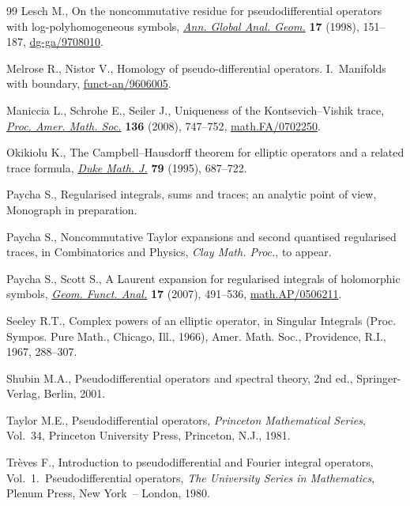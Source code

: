 \documentclass[pdftex]{sigma}
\numberwithin{equation}{section}
\begin{document}
\begin{thebibliography}{99}
Lesch M.,
On the noncommutative residue for pseudodif\/ferential operators with log-polyhomogeneous symbols,
\href{http://dx.doi.org/10.1023/A:1006504318696}{{\it Ann.  Global  Anal. Geom.}} {\bf 17} (1998),  151--187,
\href{http://arxiv.org/abs/dg-ga/9708010}{dg-ga/9708010}.

Melrose R.,  Nistor V.,
Homology of pseudo-dif\/ferential operators. I.~Manifolds with boundary,
\mbox{\href{http://arxiv.org/abs/funct-an/9606005}{funct-an/9606005}}. %

Maniccia L., Schrohe  E., Seiler J.,
 Uniqueness of the Kontsevich--Vishik trace,
\href{http://dx.doi.org/10.1090/S0002-9939-07-09168-X}{{\it Proc. Amer. Math. Soc.}} {\bf 136} (2008), 747--752,
\href{http://arxiv.org/abs/math.FA/0702250}{math.FA/0702250}.

 Okikiolu K.,
 The Campbell--Hausdorf\/f theorem for elliptic operators and a related trace formula,
\href{http://dx.doi.org/10.1215/S0012-7094-95-07918-6}{{\it Duke Math. J.}}  {\bf 79}  (1995), 687--722.

 Paycha S.,
 Regularised integrals, sums and traces; an  analytic point of view, Monograph in preparation.

Paycha S.,
Noncommutative Taylor expansions and  second quantised regularised traces,
in Combinatorics and Physics, {\it Clay Math. Proc.}, to appear.

  Paycha  S., Scott  S.,
  A  Laurent expansion for  regularised integrals of holomorphic symbols,
\href{http://dx.doi.org/10.1007/s00039-007-0597-8}{{\it Geom.  Funct. Anal.}} {\bf 17} (2007), 491--536,
\href{http://arxiv.org/abs/math.AP/0506211}{math.AP/0506211}.

Seeley R.T.,
Complex powers of an elliptic operator,
in Singular Integrals (Proc. Sympos. Pure Math., Chicago, Ill., 1966), Amer. Math. Soc., Providence, R.I., 1967, 288--307.

Shubin M.A.,
Pseudodif\/ferential operators and spectral theory, 2nd ed., Springer-Verlag, Berlin, 2001.


Taylor M.E.,  Pseudodif\/ferential operators,
{\it Princeton Mathematical Series}, Vol.~34, Princeton University Press, Princeton, N.J., 1981.

Tr\`eves F.,
Introduction to pseudodif\/ferential and Fourier integral operators, Vol.~1.~Pseudodif\/ferential opera\-tors,
 {\it The University Series in Mathematics}, Plenum Press, New York~-- London, 1980.


\end{thebibliography}
\end{document}
